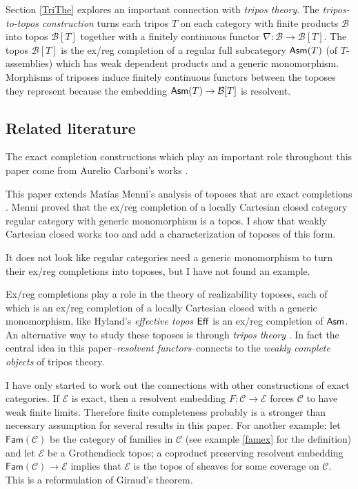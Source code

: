 \documentclass[sort&compress]{elsarticle}
\theoremstyle{plain}
\theoremstyle{definition}
\theoremstyle{remark}
\newcommand\cat\mathcal
\begin{document}
Section \ref{TriThe} explores an important connection with \emph{tripos theory}. The \emph{tripos-to-topos construction} turns each tripos $T$ on each category with finite products $\cat B$ into topos $\cat B[T]$ together with a finitely continuous functor $\nabla:\cat B\to\cat B[T]$. The topos $\cat B[T]$ is the ex/reg completion of a regular full subcategory $\mathsf{Asm}(T)$ (of $T$-assemblies) which has weak dependent products and a generic monomorphism. Morphisms of triposes induce finitely continuous functors between the toposes they represent \citep[see][]{MR2479466,Pittsthesis, MR578267,a2CAotTtTC} because the embedding $\Asm(T) \to \cat B[T]$ is resolvent.

\subsection{Related literature}
The exact completion constructions which play an important role throughout this paper come from Aurelio Carboni's works \citep{MR1600009, MR1358759, MR948482, MR678508,MR1787592}. 

This paper extends Mat\'ias Menni's analysis of toposes that are exact completions \citep{MR1900904, Menni00exactcompletions, MR1948025, MR1870615, MR2320014}. Menni proved that the ex/reg completion of a locally Cartesian closed category regular category with generic monomorphism is a topos. I show that weakly Cartesian closed works too and add a characterization of toposes of this form.

It does not look like regular categories need a generic monomorphism to turn their ex/reg completions into toposes, but I have not found an example. 

Ex/reg completions play a role in the theory of realizability toposes, each of which is an ex/reg completion of a locally Cartesian closed with a generic monomorphism, like Hyland's \emph{effective topos} $\mathsf{Eff}$ \citep{MR717245, MR2479466} is an ex/reg completion of $\mathsf{Asm}$. An alternative way to study these toposes is through \emph{tripos theory} \citep{MR2479466,Pittsthesis, MR578267,a2CAotTtTC}. In fact the central idea in this paper--\emph{resolvent functors}--connects to the \emph{weakly complete objects} of tripos theory. 

\newcommand\Fam{\mathsf{Fam}}
I have only started to work out the connections with other constructions of exact categories. If $\cat E$ is exact, then a resolvent embedding $F:\cat C\to\cat E$ forces $\cat C$ to have weak finite limits. Therefore finite completeness probably is a stronger than necessary assumption for several results in this paper. For another example: let $\Fam(\cat C)$ be the category of families in $\cat C$ (see example \ref{famex} for the definition) and let $\cat E$ be a Grothendieck topos; a coproduct preserving resolvent embedding $\Fam(\cat C) \to \cat E$ implies that $\cat E$ is the topos of sheaves for some coverage on $\cat C$. This is a reformulation of Giraud's theorem.
\end{document}
